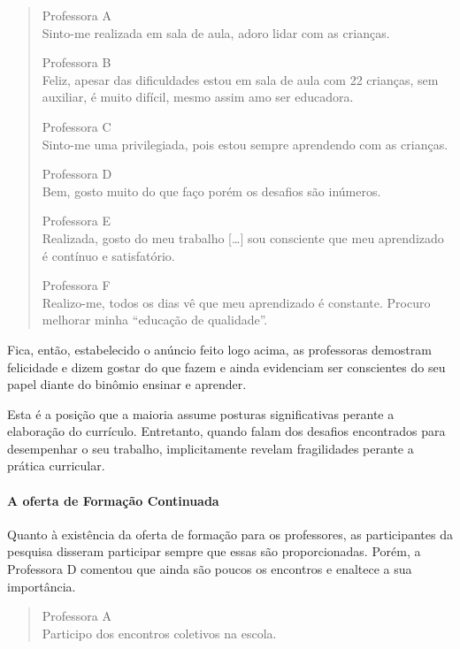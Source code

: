 \begin{refsection}
    \begin{quotation}
        \noindent\negpar[-1.5em]{}Professora A\quad{}\\Sinto-me realizada em sala de aula, adoro lidar com as crianças. 
        \medskip
    
        \negpar[-1.5em]{}Professora B\quad{}\\Feliz, apesar das dificuldades estou em sala de aula com 22 crianças, sem auxiliar, é muito difícil, mesmo assim amo ser educadora. 
        \medskip

        \negpar[-1.5em]{}Professora C\quad{}\\Sinto-me uma privilegiada, pois estou sempre aprendendo com as crianças. 
        \medskip

        \negpar[-1.5em]{}Professora D\quad{}\\Bem, gosto muito do que faço porém os desafios são inúmeros. 
        \medskip

        \negpar[-1.5em]{}Professora E\quad{}\\Realizada, gosto do meu trabalho [\dots] sou consciente que meu aprendizado é contínuo e satisfatório. 
        \medskip

        \negpar[-1.5em]{}Professora F\quad{}\\Realizo-me, todos os dias vê que meu aprendizado é constante. Procuro melhorar minha “educação de qualidade”. 
    \end{quotation}

    Fica, então, estabelecido o anúncio feito logo acima, as professoras demostram felicidade e dizem gostar do que fazem e ainda evidenciam ser conscientes do seu papel diante do binômio ensinar e aprender. 

    Esta é a posição que a maioria assume posturas significativas perante a elaboração do currículo. Entretanto, quando falam dos desafios encontrados para desempenhar o seu trabalho, implicitamente revelam fragilidades perante a prática curricular. 

    \paragraph{A oferta de Formação Continuada} Quanto à existência da oferta de formação para os professores, as participantes da pesquisa disseram participar sempre que essas são proporcionadas. Porém, a Professora D comentou que ainda são poucos os encontros e enaltece a sua importância.
    
    \begin{quotation}
        \noindent\negpar[-1.5em]{}Professora A\quad{}\\Participo dos encontros coletivos na escola. 
        \medskip
    

\end{quotation}
\end{refsection}
